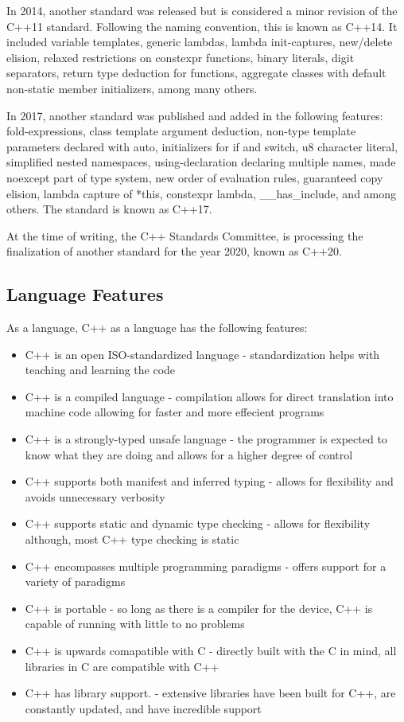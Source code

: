 \documentclass[12pt]{article}
\begin{document}
In 2014, another standard was released but is considered a minor revision of the C++11 standard. Following the naming convention, this is known as C++14. It included variable templates, generic lambdas, lambda init-captures, new/delete elision, relaxed restrictions on constexpr functions, binary literals, digit separators, return type deduction for functions, aggregate classes with default non-static member initializers, among many others.

In 2017, another standard was published and added in the following features: fold-expressions, class template argument deduction, non-type template parameters declared with auto, initializers for if and switch, u8 character literal, simplified nested namespaces, using-declaration declaring multiple names, made noexcept part of type system, new order of evaluation rules, guaranteed copy elision, lambda capture of *this, constexpr lambda, \_\_has\_include, and among others. The standard is known as C++17.

At the time of writing, the C++ Standards Committee, is processing the finalization of another standard for the year 2020, known as C++20.

\subsection{Language Features}
As a language, C++ as a language has the following features:

\begin{itemize}
  \item C++ is an open ISO-standardized language - standardization helps with teaching and learning the code
  \item C++ is a compiled language - compilation allows for direct translation into machine code allowing for faster and more effecient programs
  \item C++ is a strongly-typed unsafe language - the programmer is expected to know what they are doing and allows for a higher degree of control
  \item C++ supports both manifest and inferred typing - allows for flexibility and avoids unnecessary verbosity
  \item C++ supports static and dynamic type checking - allows for flexibility although, most C++ type checking is static
  \item C++ encompasses multiple programming paradigms - offers support for a variety of paradigms
  \item C++ is portable - so long as there is a compiler for the device, C++ is capable of running with little to no problems
  \item C++ is upwards comapatible with C - directly built with the C in mind, all libraries in C are compatible with C++
  \item C++ has library support. - extensive libraries have been built for C++, are constantly updated, and have incredible support
\end{itemize}
\end{document}
